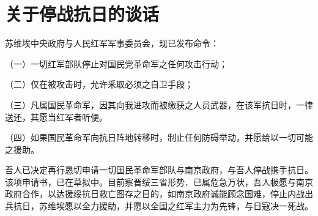\section[关于停战抗日的谈话（一九三六年十月十五日）]{关于停战抗日的谈话}


苏维埃中央政府与人民红军军事委员会，现已发布命令：

（一）一切红军部队停止对国民党革命军之任何攻击行动；

（二）仅在被攻击时，允许釆取必须之自卫手段；

（三）凡属国民革命军，因其向我进攻而被缴获之人员武器，在该军抗日时，一律送还，其愿当红军者听便。

（四）如果国民革命军向抗日阵地转移时，制止任何防碍举动，并愿给以一切可能之援助。

吾人已决定再行恳切申请一切国民革命军部队与南京政府，与吾人停战携手抗日。该项申请书，已在草拟中。目前察晋绥三省形势．已属危急万状，吾人极愿与南京政府合作，以达援绥抗日救亡图存之目的，如南京政府诚能顾念国难，停止内战出兵抗日，苏维埃愿以全力援助，并愿以全国之红军主力为先锋，与日寇决一死战。


